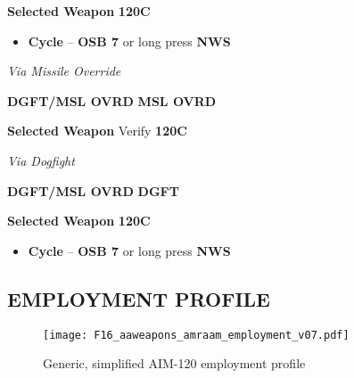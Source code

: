 \begin{tcoloritemize}
{    \begin{subenumerate}
        \item \textbf{Selected Weapon} \dotfill \textbf{120C}
        \begin{itemize}
            \item \textbf{Cycle} -- \textbf{OSB 7} or long press \textbf{NWS}
        \end{itemize}
    \end{subenumerate}

    \emph{Via Missile Override}

    \begin{subenumerate}
        \item \textbf{DGFT/MSL OVRD} \dotfill \textbf{MSL OVRD}
        \item \textbf{Selected Weapon} \dotfill Verify \textbf{120C} 
    \end{subenumerate}
    
    \emph{Via Dogfight}

    \begin{subenumerate}
        \item \textbf{DGFT/MSL OVRD} \dotfill \textbf{DGFT}
        \item \textbf{Selected Weapon} \dotfill \textbf{120C}
        \begin{itemize}
            \item \textbf{Cycle} -- \textbf{OSB 7} or long press \textbf{NWS}
        \end{itemize}
    \end{subenumerate}}
\end{tcoloritemize}

\clearpage

\subsection{EMPLOYMENT PROFILE}

\begin{figure}[h]
    \centering
    \texttt{[image: F16\_aaweapons\_amraam\_employment\_v07.pdf]}
    \caption{Generic, simplified AIM-120 employment profile}
    \label{fig:aa-weap:aim120:profile}
\end{figure}

